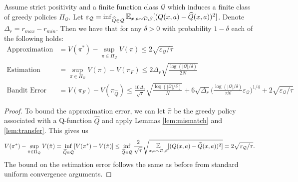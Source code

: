 \begin{subappendices}
\begin{theorem}\label{thm:val-small}
Assume strict positivity and a finite function class $ \mathcal{Q}$ which induces a finite class of greedy policies $ \Pi_\mathcal{Q}$. Let $ \varepsilon_\mathcal{Q} = \inf_{\widehat Q\in \mathcal{Q}}\E_{x,a\sim \mathcal{D}, \beta}[(Q(x,a) - \widehat Q(x,a))^2]$. Denote $ \Delta_r = r_{max} - r_{min}$. Then we have that for any $ \delta > 0$ with probability $ 1- \delta$ each of the following holds:
\begin{align}
    \text{Approximation Error} &= V(\pi^*) - \sup_{\pi\in \Pi_{\mathcal{Q}}}V(\pi) \leq 2\sqrt{\varepsilon_{\mathcal{Q}}/ \tau}\\
    \text{Estimation Error}  &= \sup_{\pi\in \Pi_{\mathcal{Q}}}V(\pi) - V(\pi_F) \leq 2\Delta_r \sqrt{\frac{\log(|\mathcal{Q}|/\delta)}{2N}}\\
    \text{Bandit Error}  &= V(\pi_F) - V(\pi_{\widehat Q}) \leq \frac{10\Delta_r}{\sqrt{\tau}} \sqrt{\frac{\log(|\mathcal{Q}|/\delta)}{N}} + 6\sqrt{\Delta_r} \bigg(\frac{\log(|\mathcal{Q}|/\delta)}{\tau N} \varepsilon_{\mathcal{Q}}\bigg)^{1/4} + 2\sqrt{\varepsilon_{\mathcal{Q}}/ \tau}
\end{align}
\end{theorem}

\begin{proof}
To bound the approximation error, we can let $ \hat \pi $ be the greedy policy associated with a Q-function $ \widehat Q$ and apply Lemmas \ref{lem:mismatch} and \ref{lem:transfer}. This gives us
\begin{align}
        V(\pi^*) - \sup_{\hat \pi\in \Pi_{\mathcal{Q}}}V(\hat \pi) =  \inf_{\widehat Q\in \mathcal{Q}} [V(\pi^*) - V(\hat \pi)] \leq \inf_{\widehat Q\in \mathcal{Q}} \frac{2}{\sqrt{\tau}}\sqrt{\E_{x,a\sim \mathcal{D}, \beta}[(Q(x,a) - \widehat Q(x,a))^2]} = 2 \sqrt{\varepsilon_\mathcal{Q} / \tau}.
\end{align}
The bound on the estimation error follows the same as before from standard uniform convergence arguments.


\end{proof}
\end{subappendices}
